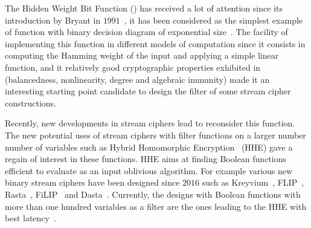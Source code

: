\documentclass[11pt]{llncs}
\begin{document}






\iffalse

The Hidden Weight Bit Function (\hwbf{}) has received a lot of attention since its introduction by Bryant
in $1991$~\cite{IEEE:Bryant91}, it has been considered as the simplest example of function with binary decision
diagram of exponential size~\cite{IEEE:Bryant91,TIA:BoLSW99}. 
The facility of implementing this function in different models of computation since it consists in computing the Hamming weight of the input and applying a simple linear function, and it relatively good cryptographic properties exhibited in~\cite{DAM:WCST14} (balancedness, nonlinearity, degree and algebraic immunity) made it an interesting starting point candidate to design the filter of some stream cipher constructions. 

Recently, new developments in stream ciphers lead to reconsider this function.
The new potential uses of stream ciphers with filter functions on a larger number number of variables such as Hybrid Homomorphic Encryption~\cite{CCS:NaeLauVai11} (\textsf{HHE}) gave a regain of interest in these functions. \textsf{HHE} aims at finding Boolean functions efficient to evaluate as an input oblivious algorithm. 
For example various new binary stream ciphers have been designed since $2016$ such as Kreyvium~\cite{JOC:CCFLNP18}, FLIP~\cite{EC:MJSC16}, Rasta~\cite{C:Rasta}, FiLIP~\cite{INDO:MCJS19} and Dasta~\cite{TOSC:BeiLea20}. 
Currently, the designs with Boolean functions with more than one hundred variables as a filter are the ones leading to the \textsf{HHE} with best latency~\cite{INDO:HofMeaRic20,CCS:CDPP22,CIC:MeaParPei24}.
\end{document}
